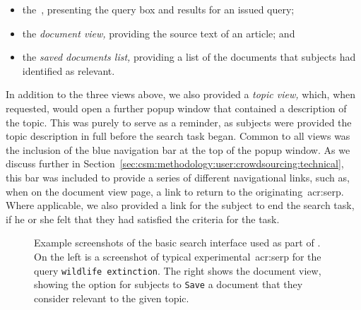 \begin{itemize}
    \item{the~, presenting the query box and results for an issued query;}
    \item{the \emph{document view,} providing the source text of an article; and}
    \item{the \emph{saved documents list,} providing a list of the documents that subjects had identified as relevant.}
\end{itemize}

In addition to the three views above, we also provided a \emph{topic view,} which, when requested, would open a further popup window that contained a description of the topic. This was purely to serve as a reminder, as subjects were provided the topic description in full before the search task began. Common to all views was the inclusion of the blue navigation bar at the top of the popup window. As we discuss further in Section~\ref{sec:csm:methodology:user:crowdsourcing:technical}, this bar was included to provide a series of different navigational links, such as, when on the document view page, a link to return to the originating~\gls{acr:serp}. Where applicable, we also provided a link for the subject to end the search task, if he or she felt that they had satisfied the criteria for the task.

\begin{figure}[t!]
    \centering
    \caption[Example screenshots of the experimental interfaces]{Example screenshots of the basic search interface used as part of \treconomics. On the left is a screenshot of typical experimental~\gls{acr:serp} for the query \texttt{wildlife extinction}. The right shows the document view, showing the option for subjects to \texttt{Save} a document that they consider relevant to the given topic.}
    \label{fig:interfaces}
\end{figure}

